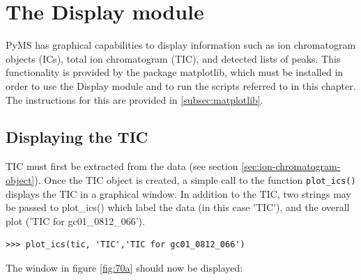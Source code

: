 

\chapter{The Display module}
\label{chapter:display}
PyMS has graphical capabilities to display information such as ion chromatogram
objects (ICs), total ion chromatogram (TIC), and detected lists of peaks.
This functionality is provided by the package matplotlib, which must be installed
in order to use the Display module and to run the scripts referred to in this
chapter. The instructions for this are provided in \ref{subsec:matplotlib}.

\section{Displaying the TIC}
\label{sec:display-tic}

TIC must first be extracted from the data (see section
\ref{sec:ion-chromatogram-object}).  Once the TIC object is created,
a simple call to the function {\tt plot\_ics()} displays the TIC in a
graphical window. In addition to the TIC, two strings may be passed
to plot\_ics() which label the data (in this case 'TIC'), and the
overall plot ('TIC for gc01\_0812\_066').

\begin{verbatim}
>>> plot_ics(tic, 'TIC','TIC for gc01_0812_066')
\end{verbatim}

The window in figure \ref{fig:70a} should now be displayed:

